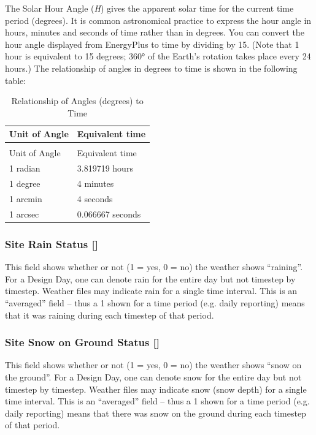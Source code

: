 The Solar Hour Angle (\emph{H}) gives the apparent solar time for the current time period (degrees). It is common astronomical practice to express the hour angle in hours, minutes and seconds of time rather than in degrees. You can convert the hour angle displayed from EnergyPlus to time by dividing by 15. (Note that 1 hour is equivalent to 15 degrees; \ang{360} of the Earth's rotation takes place every 24 hours.) The relationship of angles in degrees to time is shown in the following table:

\begin{longtable}[c]{@{}ll@{}}
\caption{Relationship of Angles (degrees) to Time \label{table:relationship-of-angles-degrees-to-time}} \tabularnewline
\toprule
Unit of Angle & Equivalent time \tabularnewline
\midrule
\endfirsthead

\caption[]{Relationship of Angles (degrees) to Time} \tabularnewline
\toprule
Unit of Angle & Equivalent time \tabularnewline
\midrule
\endhead

1 radian & 3.819719 hours \tabularnewline
1 degree & 4 minutes \tabularnewline
1 arcmin & 4 seconds \tabularnewline
1 arcsec & 0.066667 seconds \tabularnewline
\bottomrule
\end{longtable}

\subsubsection{Site Rain Status {[]}}\label{site-rain-status}

This field shows whether or not (1 = yes, 0 = no) the weather shows ``raining''. For a Design Day, one can denote rain for the entire day but not timestep by timestep. Weather files may indicate rain for a single time interval. This is an ``averaged'' field -- thus a 1 shown for a time period (e.g. daily reporting) means that it was raining during each timestep of that period.

\subsubsection{Site Snow on Ground Status {[]}}\label{site-snow-on-ground-status}

This field shows whether or not (1 = yes, 0 = no) the weather shows ``snow on the ground''. For a Design Day, one can denote snow for the entire day but not timestep by timestep. Weather files may indicate snow (snow depth) for a single time interval. This is an ``averaged'' field -- thus a 1 shown for a time period (e.g. daily reporting) means that there was snow on the ground during each timestep of that period.

